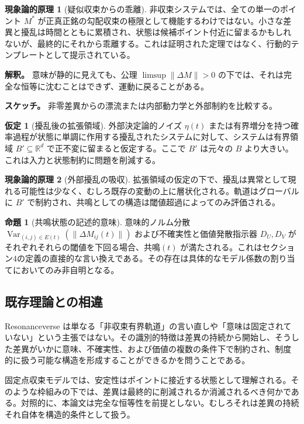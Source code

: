 \documentclass[11pt,a4paper]{article}
\theoremstyle{definition}
\newtheorem{proposition}{命題}[section]
\newtheorem{assumption}{仮定}[section]
\newtheorem{phenomenological}{現象論的原理}[section]
\begin{document}
\begin{phenomenological}[疑似収束からの乖離]
非収束システムでは、全ての単一のポイント $M^*$ が正真正銘の勾配収束の極限として機能するわけではない。小さな差異と擾乱は時間とともに累積され、状態は候補ポイント付近に留まるかもしれないが、最終的にそれから乖離する。これは証明された定理ではなく、行動的テンプレートとして提示されている。

\textbf{解釈。} 意味が静的に見えても、公理 $\limsup \|\Delta M\| > 0$ の下では、それは完全な恒等に沈むことはできず、運動に戻ることがある。

\textbf{スケッチ。} 非零差異からの漂流または内部動力学と外部制約を比較する。
\end{phenomenological}

\begin{assumption}[擾乱後の拡張領域]
外部決定論的ノイズ $\eta(t)$ または有界増分を持つ確率過程が状態に単調に作用する擾乱されたシステムに対して、システムは有界領域 $B' \subseteq \mathbb{R}^d$ で正不変に留まると仮定する。ここで $B'$ は元々の $B$ より大きい。これは入力と状態制約に問題を削減する。
\end{assumption}

\begin{phenomenological}[外部擾乱の吸収]
拡張領域の仮定の下で、擾乱は異常として現れる可能性は少なく、むしろ既存の変動の上に層状化される。軌道はグローバルに $B'$ で制約され、共鳴としての構造は閾値超過によってのみ評価される。
\end{phenomenological}

\begin{proposition}[共鳴状態の記述的意味]
意味的ノルム分散 $\operatorname{Var}_{(i,j)\in E(t)}(\|\Delta M_{ij}(t)\|)$ および不確実性と価値発散指示器 $D_U, D_V$ がそれぞれそれらの閾値を下回る場合、$\text{共鳴}(t)$ が満たされる。これはセクション4の定義の直接的な言い換えである。その存在は具体的なモデル係数の割り当てにおいてのみ非自明となる。
\end{proposition}

\subsection{既存理論との相違}

Resonanceverse は単なる「非収束有界軌道」の言い直しや「意味は固定されていない」という主張ではない。その識別的特徴は差異の持続から開始し、そうした差異がいかに意味、不確実性、および価値の複数の条件下で制約され、制度的に扱う可能な構造を形成することができるかを問うことである。

固定点収束モデルでは、安定性はポイントに接近する状態として理解される。そのような枠組みの下では、差異は最終的に削減されるか消滅されるべき何かである。対照的に、本論文は完全な恒等性を前提としない。むしろそれは差異の持続それ自体を構造的条件として扱う。
\end{document}
